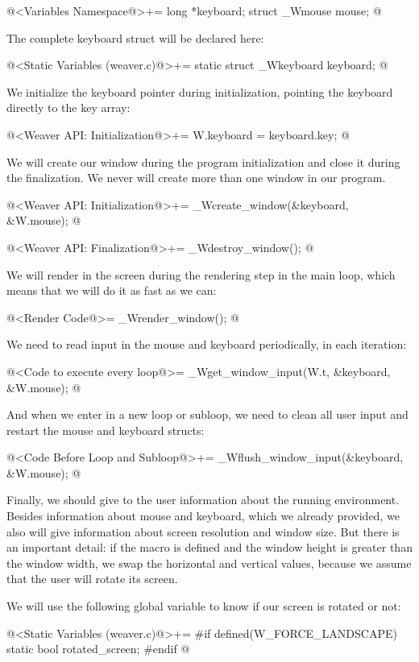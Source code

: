 \iniciocodigo
@<Variables Namespace@>+=
long *keyboard;
struct _Wmouse mouse;
@
\fimcodigo

The complete keyboard struct will be declared here:

\iniciocodigo
@<Static Variables (weaver.c)@>+=
static struct _Wkeyboard keyboard;
@
\fimcodigo

We initialize the keyboard pointer during initialization, pointing the
keyboard directly to the key array:

\iniciocodigo
@<Weaver API: Initialization@>+=
W.keyboard = keyboard.key;
@
\fimcodigo

We will create our window during the program initialization and close
it during the finalization. We never will create more than one window
in our program.

\iniciocodigo
@<Weaver API: Initialization@>+=
_Wcreate_window(&keyboard, &W.mouse);
@
\fimcodigo

\iniciocodigo
@<Weaver API: Finalization@>+=
_Wdestroy_window();
@
\fimcodigo

We will render in the screen during the rendering step in the main
loop, which means that we will do it as fast as we can:

\iniciocodigo
@<Render Code@>=
_Wrender_window();
@
\fimcodigo

We need to read input in the mouse and keyboard periodically, in each
iteration:

\iniciocodigo
@<Code to execute every loop@>=
_Wget_window_input(W.t, &keyboard, &W.mouse);
@
\fimcodigo

And when we enter in a new loop or subloop, we need to clean all user
input and restart the mouse and keyboard structs:

\iniciocodigo
@<Code Before Loop and Subloop@>+=
_Wflush_window_input(&keyboard, &W.mouse);
@
\fimcodigo

Finally, we should give to the user information about the running
environment. Besides information about mouse and keyboard, which we
already provided, we also will give information about screen
resolution and window size. But there is an important detail: if the
macro  is defined and the window
height is greater than the window width, we swap the horizontal and
vertical values, because we assume that the user will rotate its
screen.

We will use the following global variable to know if our screen is
rotated or not:

\iniciocodigo
@<Static Variables (weaver.c)@>+=
#if defined(W_FORCE_LANDSCAPE)
static bool rotated_screen;
#endif
@
\fimcodigo

